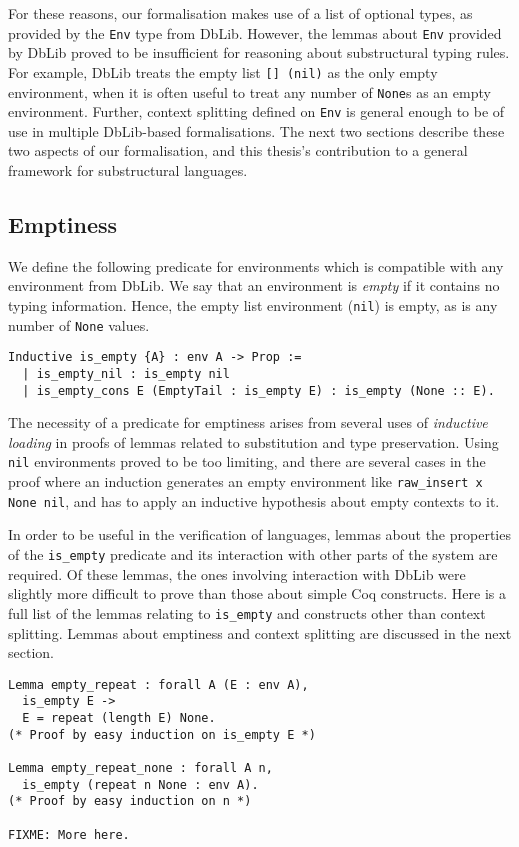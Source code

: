 \documentclass[]{unswthesis}
\let\c\texttt
\let\i\textit
\begin{document}
For these reasons, our formalisation makes use of a list of optional types, as provided by the \c{Env} type from DbLib. However, the lemmas about \c{Env} provided by DbLib proved to be insufficient for reasoning about substructural typing rules. For example, DbLib treats the empty list \c{[] (nil)} as the only empty environment, when it is often useful to treat any number of \c{None}s as an empty environment. Further, context splitting defined on \c{Env} is general enough to be of use in multiple DbLib-based formalisations. The next two sections describe these two aspects of our formalisation, and this thesis's contribution to a general framework for substructural languages.

\subsection{Emptiness}

We define the following predicate for environments which is compatible with any environment from DbLib. We say that an environment is \i{empty} if it contains no typing information. Hence, the empty list environment (\c{nil}) is empty, as is any number of \c{None} values.

\begin{verbatim}
Inductive is_empty {A} : env A -> Prop :=
  | is_empty_nil : is_empty nil
  | is_empty_cons E (EmptyTail : is_empty E) : is_empty (None :: E).
\end{verbatim}

The necessity of a predicate for emptiness arises from several uses of \i{inductive loading} in proofs of lemmas related to substitution and type preservation. Using \c{nil} environments proved to be too limiting, and there are several cases in the proof where an induction generates an empty environment like \c{raw_insert x None nil}, and has to apply an inductive hypothesis about empty contexts to it.

In order to be useful in the verification of languages, lemmas about the properties of the \c{is_empty} predicate and its interaction with other parts of the system are required. Of these lemmas, the ones involving interaction with DbLib were slightly more difficult to prove than those about simple Coq constructs. Here is a full list of the lemmas relating to \c{is_empty} and constructs other than context splitting. Lemmas about emptiness and context splitting are discussed in the next section.

\begin{verbatim}
Lemma empty_repeat : forall A (E : env A),
  is_empty E ->
  E = repeat (length E) None.
(* Proof by easy induction on is_empty E *)

Lemma empty_repeat_none : forall A n,
  is_empty (repeat n None : env A).
(* Proof by easy induction on n *)

FIXME: More here.
\end{verbatim}
\end{document}
